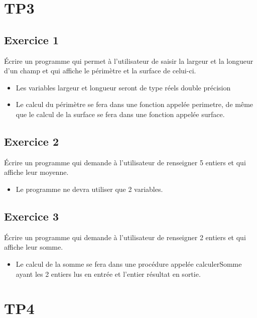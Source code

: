 \documentclass{article}
\date{Noyau C+\\ Semestre 1}
\begin{document}
	\maketitle
	\section{TP3}
		\subsection{Exercice 1}
			Écrire un programme qui permet à l'utilisateur de saisir la largeur et la longueur d'un champ et qui affiche le périmètre et la surface de celui-ci.
			\begin{itemize}
				\item Les variables largeur et longueur seront de type réels double précision
				\item Le calcul du périmètre se fera dans une fonction appelée perimetre, de même que le calcul de la surface se fera dans une fonction appelée surface.
			\end{itemize}		
			
		\newpage
		\subsection{Exercice 2}
			Écrire un programme qui demande à l'utilisateur de renseigner 5 entiers et qui affiche leur moyenne.
			\begin{itemize}
				\item Le programme ne devra utiliser que 2 variables.
			\end{itemize}			
			
		\subsection{Exercice 3}
			Écrire un programme qui demande à l'utilisateur de renseigner 2 entiers et qui affiche leur somme.
			\begin{itemize}
				\item Le calcul de la somme se fera dans une procédure appelée calculerSomme ayant les 2 entiers lus en entrée et l'entier résultat en sortie.
			\end{itemize}				
			
	\section{TP4}
\end{document}
